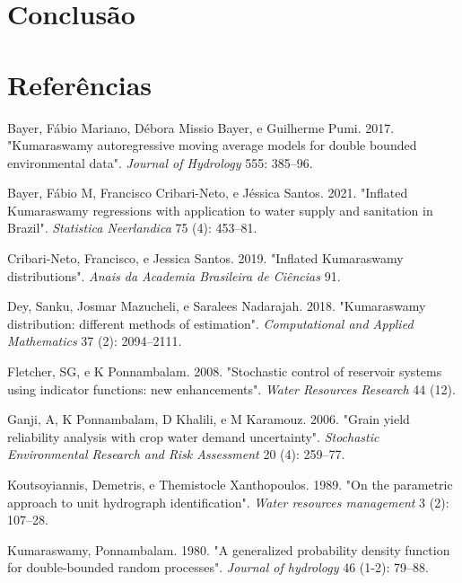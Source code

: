 \documentclass[
]{article}
\newlength{\cslhangindent}
\newlength{\cslentryspacingunit} %
\newenvironment{CSLReferences}[2] %
 {%
  \setlength{\parindent}{0pt}
  \ifodd #1
  \let\oldpar\par
  \def\par{\hangindent=\cslhangindent\oldpar}
  \fi
  \setlength{\parskip}{#2\cslentryspacingunit}
 }%
 {}
\begin{document}
\section{\centering Conclusão}

\section{\centering Referências}

\hypertarget{refs}{}
\begin{CSLReferences}{1}{0}
\leavevmode{}%
Bayer, Fábio Mariano, Débora Missio Bayer, e Guilherme Pumi. 2017.
{"Kumaraswamy autoregressive moving average models for double bounded
environmental data"}. \emph{Journal of Hydrology} 555: 385--96.

\leavevmode{}%
Bayer, Fábio M, Francisco Cribari-Neto, e Jéssica Santos. 2021.
{"Inflated Kumaraswamy regressions with application to water supply and
sanitation in Brazil"}. \emph{Statistica Neerlandica} 75 (4): 453--81.

\leavevmode{}%
Cribari-Neto, Francisco, e Jessica Santos. 2019. {"Inflated Kumaraswamy
distributions"}. \emph{Anais da Academia Brasileira de Ci{ê}ncias} 91.

\leavevmode{}%
Dey, Sanku, Josmar Mazucheli, e Saralees Nadarajah. 2018. {"Kumaraswamy
distribution: different methods of estimation"}. \emph{Computational and
Applied Mathematics} 37 (2): 2094--2111.

\leavevmode{}%
Fletcher, SG, e K Ponnambalam. 2008. {"Stochastic control of reservoir
systems using indicator functions: new enhancements"}. \emph{Water
Resources Research} 44 (12).

\leavevmode{}%
Ganji, A, K Ponnambalam, D Khalili, e M Karamouz. 2006. {"Grain yield
reliability analysis with crop water demand uncertainty"}.
\emph{Stochastic Environmental Research and Risk Assessment} 20 (4):
259--77.

\leavevmode{}%
Koutsoyiannis, Demetris, e Themistocle Xanthopoulos. 1989. {"On the
parametric approach to unit hydrograph identification"}. \emph{Water
resources management} 3 (2): 107--28.

\leavevmode{}%
Kumaraswamy, Ponnambalam. 1980. {"A generalized probability density
function for double-bounded random processes"}. \emph{Journal of
hydrology} 46 (1-2): 79--88.


\end{CSLReferences}
\end{document}
